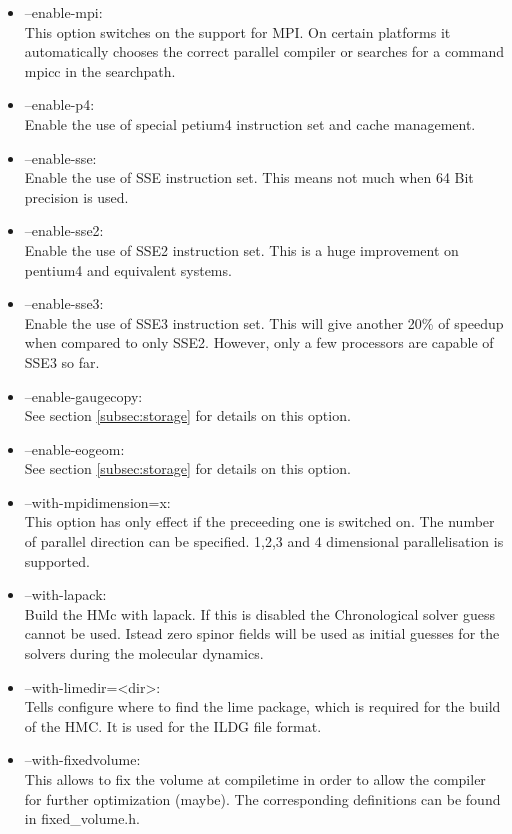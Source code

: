 \begin{itemize}
\item {\ttfamily --enable-mpi}:\\
  This option switches on the support for MPI. On certain platforms it
  automatically chooses the correct parallel compiler or searches for
  a command {\ttfamily mpicc} in the searchpath.

\item {\ttfamily --enable-p4}:\\
  Enable the use of special petium4 instruction set and cache
  management.

\item {\ttfamily --enable-sse}:\\
  Enable the use of SSE instruction set. This means not much when 64
  Bit precision is used.

\item {\ttfamily --enable-sse2}:\\
  Enable the use of SSE2 instruction set. This is a huge improvement
  on pentium4 and equivalent systems.

\item {\ttfamily --enable-sse3}:\\
  Enable the use of SSE3 instruction set. This will give another 20\%
  of speedup when compared to only SSE2. However, only a few
  processors are capable of SSE3 so far.

\item {\ttfamily --enable-gaugecopy}:\\
  See section \ref{subsec:storage} for details on this option.

\item {\ttfamily --enable-eogeom}:\\
  See section \ref{subsec:storage} for details on this option.


\item {\ttfamily --with-mpidimension=x}:\\
  This option has only effect if the preceeding one is switched
  on. The number of parallel direction can be specified. 1,2,3 and 4
  dimensional parallelisation is supported.

\item {\ttfamily --with-lapack}:\\
  Build the HMc with lapack. If this is disabled the Chronological
  solver guess cannot be used. Istead zero spinor fields will be used
  as initial guesses for the solvers during the molecular dynamics.

\item {\ttfamily --with-limedir=<dir>}:\\
 Tells configure where to find the lime package, which is required for
 the build of the HMC. It is used for the ILDG file format.

\item {\ttfamily --with-fixedvolume}:\\
  This allows to fix the volume at compiletime in order to allow the
  compiler for further optimization (maybe). The corresponding
  definitions can be found in {\ttfamily fixed_volume.h}.

\end{itemize}

